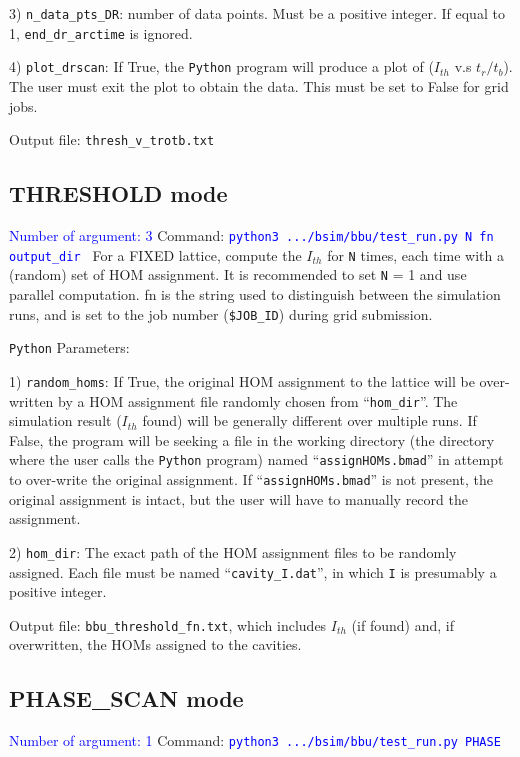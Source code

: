 \documentclass{hitec}
\begin{document}
3) \texttt{n_data_pts_DR}: number of data points. Must be a positive integer. If equal to 1, \texttt{end_dr_arctime} is ignored.

4) \texttt{plot_drscan}: If True, the \texttt{Python} program will produce a plot of ($I_{th}$ v.s $t_r/t_b$). The user must exit the plot to obtain the data. This must be set to False for grid jobs.  

\bigbreak
Output file: \texttt{thresh_v_trotb.txt}

\subsection{THRESHOLD mode}      
\textcolor{blue}{Number of argument: 3}
\bigbreak
Command: \textcolor{blue}{\texttt{python3 .../bsim/bbu/test_run.py  \text{} N \text{} fn \text{} output_dir }}
\bigbreak
For a FIXED lattice, compute the $I_{th}$ for \texttt{N} times, each time with a (random) set of HOM assignment. It is recommended to set \texttt{N} = 1 and use parallel computation. fn is the string used to distinguish between the simulation runs, and is set to the job number (\texttt{\$JOB_ID}) during grid submission.

\bigbreak
\texttt{Python} Parameters:

1) \texttt{random_homs}: If True, the original HOM assignment to the lattice will be over-written by a HOM assignment file  randomly chosen from ``\texttt{hom_dir}''.
The simulation result ($I_{th}$ found) will be generally different over multiple runs. 
If False, the program will be seeking a file in the working directory (the directory where the user calls the \texttt{Python} program) named ``\texttt{assignHOMs.bmad}'' in attempt to over-write the original assignment. If ``\texttt{assignHOMs.bmad}'' is not present, the original assignment is intact, but the user will have to manually record the assignment. 

2) \texttt{hom_dir}:
The exact path of the HOM assignment files to be randomly assigned. Each file must be named ``\texttt{cavity_I.dat}'', in which \texttt{I} is presumably a positive integer.

\bigbreak
Output file:  \texttt{bbu_threshold_fn.txt}, which includes $I_{th}$ (if found) and, if overwritten, the HOMs assigned to the cavities.

\subsection{PHASE_SCAN mode}
\textcolor{blue}{Number of argument: 1}
\bigbreak
Command:  \textcolor{blue}{\texttt{python3 .../bsim/bbu/test_run.py  PHASE}}
\end{document}
